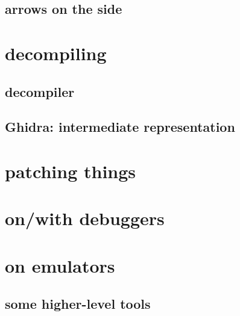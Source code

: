 \subsection{arrows on the side}


\section{decompiling}

\subsection{decompiler}


\subsection{Ghidra: intermediate representation}


\section{patching things}


\section{on/with debuggers}



\section{on emulators}


\subsection{some higher-level tools}



